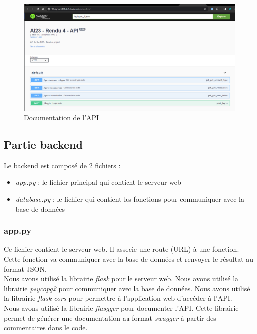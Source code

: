 \documentclass{report-UTC}
\begin{document}
\begin{figure}[H]
\centering
\includegraphics[width=15cm]{./images/swagger.png}
\caption{Documentation de l'API}
\end{figure}

\subsection{Partie backend}

Le backend est composé de 2 fichiers : 

\begin{itemize}
    \item \textit{app.py} : le fichier principal qui contient le serveur web
    \item \textit{database.py} : le fichier qui contient les fonctions pour communiquer
    avec la base de données
\end{itemize}

\subsubsection{app.py}

Ce fichier contient le serveur web. Il associe une route (URL) à une fonction.
Cette fonction va communiquer avec la base de données et renvoyer le résultat
au format JSON. \\

Nous avons utilisé la librairie \textit{flask} pour le serveur web. Nous avons
utilisé la librairie \textit{psycopg2} pour communiquer avec la base de données.
Nous avons utilisé la librairie \textit{flask-cors} pour permettre à l'application
web d'accéder à l'API. \\

Nous avons utilisé la librairie \textit{flasgger} pour documenter l'API. Cette
librairie permet de générer une documentation au format \textit{swagger} à partir
des commentaires dans le code. \\
\end{document}
